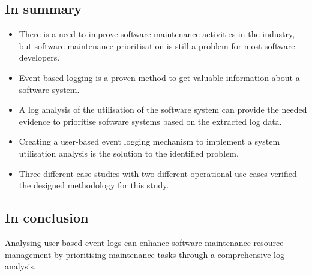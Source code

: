 \subsection{In summary}
\begin{itemize}
	\item There is a need to improve software maintenance activities in the industry, but software
	maintenance prioritisation is still a problem for most software developers.
	\item Event-based logging is a proven method to get valuable information about a software
	system.
	\item A log analysis of the utilisation of the software system can provide the needed evidence
	to prioritise software systems based on the extracted log data.
	\item Creating a user-based event logging mechanism to implement a system utilisation analysis
	is the solution to the identified problem.
	\item Three different case studies with two different operational use cases verified the
	designed methodology for this study.
\end{itemize}

\subsection{In conclusion}
Analysing user-based event logs can enhance software maintenance resource management by prioritising maintenance tasks through a comprehensive log analysis.